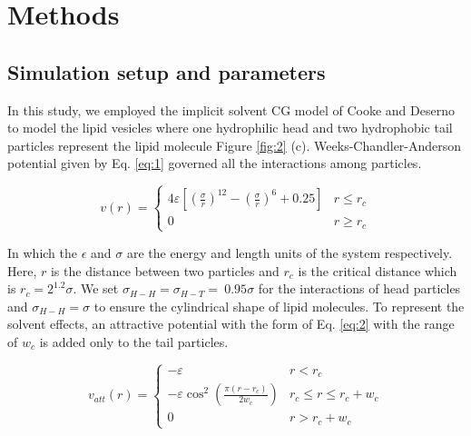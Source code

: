 \chapter{Methods}


\section{Simulation setup and parameters}\label{subsec: Simulation setup and parameters}

In this study, we employed the implicit solvent CG model of Cooke and Deserno\cite{a53} to model the lipid vesicles where one hydrophilic head and two hydrophobic tail particles represent the lipid molecule Figure \ref{fig:2} (c). Weeks-Chandler-Anderson potential given by Eq. \ref{eq:1} governed all the interactions among particles. 

\vspace{0.5cm}
\begin{equation}\label{eq:1}
v(r)=\left\{
\begin{array}{cc}
4 \varepsilon\left[\left(\frac{\sigma}{r}\right)^{12}-\left(\frac{\sigma}{r}\right)^6+0.25\right] & r \leq r_c \\
0 & r \geq r_c
\end{array}\right.
\end{equation}
\vspace{0.5cm}

In which the $\epsilon$ and $\sigma$ are the energy and length units of the system respectively. Here, $r$ is the distance between two particles and $r_c$ is the critical distance which is $r_c=2^{1.2}\sigma$. We set $\sigma_{H-H}= \sigma_{H-T}=\ 0.95\sigma$ for the interactions of head particles and  $\sigma_{H-H}=\sigma$ to ensure the cylindrical shape of lipid molecules. To represent the solvent effects, an attractive potential with the form of Eq. \ref{eq:2} with the range of $w_c$ is added only to the tail particles.

\vspace{0.5cm}
\begin{equation}\label{eq:2}
v_{a t t}(r)=\left\{\begin{array}{cc}
-\varepsilon & r<r_c \\
-\varepsilon \cos ^2\left(\frac{\pi\left(r-r_c\right)}{2 w_c}\right) & r_c \leq r \leq r_c+w_c \\
0 & r>r_c+w_c
\end{array}\right.
\end{equation}
\vspace{0.5cm}

